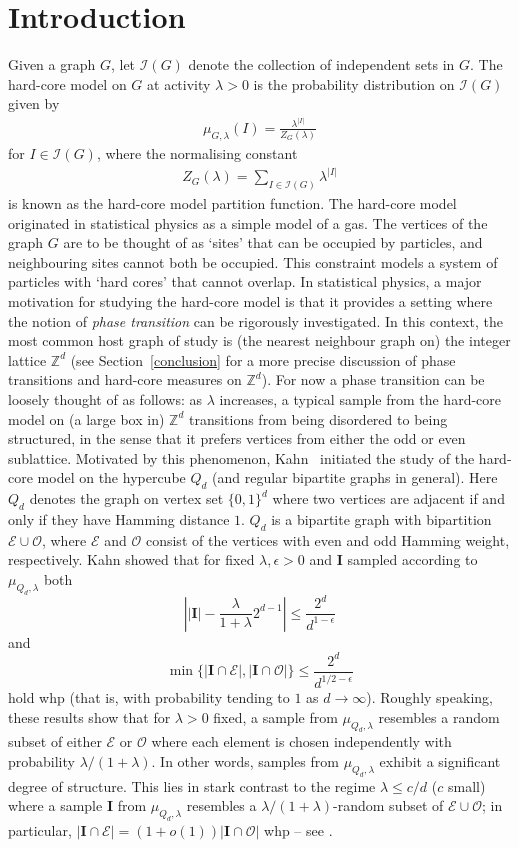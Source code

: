 \documentclass[a4paper]{amsart}
\theoremstyle{definition}
\newcommand{\cO}{\mathcal{O} }
\newcommand{\cE}{\mathcal{E} }
\newcommand{\eps}{\epsilon}
\newcommand{\0}[0]{\emptyset}
\newcommand{\lam}{\lambda}
\begin{document}
\section{Introduction}
Given a graph $G$, let $\mathcal{I}(G)$ denote the collection of independent sets in $G$.
 The hard-core model on $G$ at activity $\lambda>0$ is the probability distribution on $\mathcal I(G)$ given by
 \begin{align}\label{eqHCUnidef}
 \mu_{G,\lambda}(I)=\frac{\lambda^{|I|}}{Z_G(\lambda)}
 \end{align}
for $I\in \mathcal{I}(G)$, where the normalising constant
 \begin{align}\label{eqHCPartdef}
Z_G(\lambda)= \sum_{I\in \mathcal{I}(G)}\lambda^{|I|}
\end{align}
is known as the hard-core model partition function. 
The hard-core model originated in statistical physics as a simple model of a gas. 
The vertices of the graph $G$ are to be thought of as `sites' that can be occupied by particles, and neighbouring sites cannot both be occupied.  
This constraint models a system of particles with `hard cores' that cannot overlap. In statistical physics, a major motivation for studying the hard-core model is that it provides a setting where the notion of \emph{phase transition} can be rigorously investigated. In this context, the most common host graph of study is (the nearest neighbour graph on) the integer lattice $\mathbb Z^d$ (see Section~\ref{conclusion} for a more precise discussion of phase transitions and hard-core measures on $\mathbb Z^d$). For now a phase transition can be loosely thought of as follows: as $\lam$ increases, a typical sample from the hard-core model on (a large box in) $\mathbb Z^d$ transitions from being disordered to being structured, in the sense that it prefers vertices from either the odd or even sublattice. 
Motivated by this phenomenon, Kahn~\cite{kahn2001entropy} initiated the study of the hard-core model on the hypercube $Q_d$ (and regular bipartite graphs in general). Here $Q_d$ denotes the graph on vertex set $\{0,1\}^d$ where two vertices are adjacent if and only if they have Hamming distance $1$. $Q_d$ is a bipartite graph with bipartition $\cE \cup \cO$, where $\cE$ {and} $\cO$ consist of the vertices with even {and} odd Hamming weight, respectively. Kahn showed that for fixed $\lam, \eps>0$ and $\mathbf I$ sampled according to $\mu_{Q_d,\lam}$ both
\[
\left||\mathbf I| - \frac{\lam}{1+\lam}2^{d-1} \right|\leq \frac{2^d}{d^{1-\eps}}
\]
and 
\[
\min\{|\mathbf I \cap \cE|, |\mathbf I \cap \cO |\}\leq  \frac{2^d}{d^{1/2-\eps}}
\]
hold whp (that is, with probability tending to $1$ as $d\to\infty$). Roughly speaking, these results show that for $\lam>0$ fixed, a sample from $\mu_{Q_d,\lam}$ resembles a random subset of either $\cE$ or $\cO$ where each element is chosen independently with probability $\lam/(1+\lam)$. In other words, samples from $\mu_{Q_d,\lam}$ exhibit a significant degree of structure. This lies in stark contrast to the regime $\lam\leq c/d$ ($c$ small) where a sample $\mathbf I$ from $\mu_{Q_d,\lam}$ resembles a $\lam/(1+\lam)$-random subset of $\cE \cup \cO$; in particular, $|\mathbf I \cap \cE|=(1+o(1))|\mathbf I \cap \cO|$ whp -- see \cite{weitz}.
\end{document}
